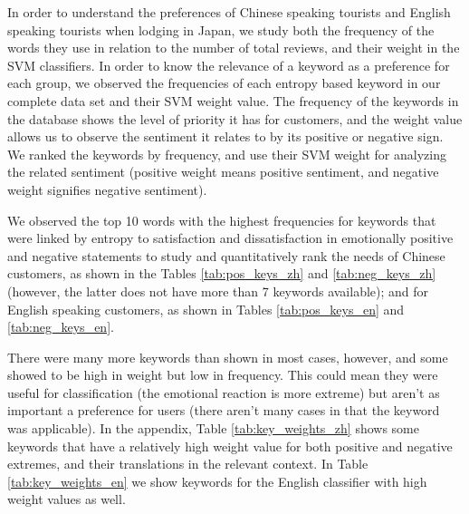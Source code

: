 \documentclass[review]{elsarticle}
\begin{document}
In order to understand the preferences of Chinese speaking tourists and English speaking tourists when lodging in Japan, we study both the frequency of the words they use in relation to the number of total reviews, and their weight in the SVM classifiers. In order to know the relevance of a keyword as a preference for each group, we observed the frequencies of each entropy based keyword in our complete data set and their SVM weight value. The frequency of the keywords in the database shows the level of priority it has for customers, and the weight value allows us to observe the sentiment it relates to by its positive or negative sign. We ranked the keywords by frequency, and use their SVM weight for analyzing the related sentiment (positive weight means positive sentiment, and negative weight signifies negative sentiment). 

We observed the top 10 words with the highest frequencies for keywords that were linked by entropy to satisfaction and dissatisfaction in emotionally positive and negative statements to study and quantitatively rank the needs of Chinese customers, as shown in the Tables \ref{tab:pos_keys_zh} and \ref{tab:neg_keys_zh} (however, the latter does not have more than 7 keywords available); and for English speaking customers, as shown in Tables \ref{tab:pos_keys_en} and \ref{tab:neg_keys_en}.

There were many more keywords than shown in most cases, however, and some showed to be high in weight but low in frequency. This could mean they were useful for classification (the emotional reaction is more extreme) but aren't as important a preference for users (there aren't many cases in that the keyword was applicable). In the appendix, Table \ref{tab:key_weights_zh} shows some keywords that have a relatively high weight value for both positive and negative extremes, and their translations in the relevant context. In Table \ref{tab:key_weights_en} we show keywords for the English classifier with high weight values as well.

\end{document}
